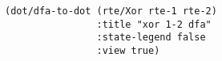 \begin{lstlisting}[style=reclojureClojure,frame=single]
(dot/dfa-to-dot (rte/Xor rte-1 rte-2)
                :title "xor 1-2 dfa"
                :state-legend false
                :view true)                         
\end{lstlisting}
